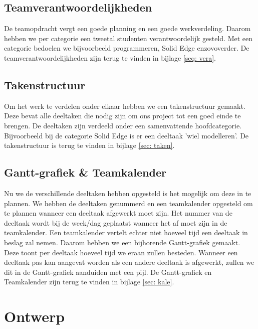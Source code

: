 \documentclass[a4paper,twoside,kulak]{kulakreport}
\begin{document}
	\subsection*{Teamverantwoordelijkheden}De teamopdracht vergt een goede planning en een goede werkverdeling. Daarom hebben we per categorie een tweetal studenten verantwoordelijk gesteld. Met een categorie bedoelen we bijvoorbeeld programmeren, Solid Edge enzovoverder. De teamverantwoordelijkheden zijn terug te vinden in bijlage \ref{seq: vera}.
	 
	\subsection*{Takenstructuur}Om het werk te verdelen onder elkaar hebben we een takenstructuur gemaakt. Deze bevat alle deeltaken die nodig zijn om ons project tot een goed einde te brengen. De deeltaken zijn verdeeld onder een samenvattende hoofdcategorie. Bijvoorbeeld bij de categorie Solid Edge is er een deeltaak 'wiel modelleren'. De takenstructuur is terug te vinden in bijlage \ref{sec: taken}.
	\subsection*{Gantt-grafiek \& Teamkalender} Nu we de verschillende deeltaken hebben opgesteld is het mogelijk om deze in te plannen. We hebben de deeltaken genummerd en een teamkalender opgesteld om te plannen wanneer een deeltaak afgewerkt moet zijn. Het nummer van de deeltaak wordt bij de week/dag geplaatst wanneer het af moet zijn in de teamkalender. Een teamkalender vertelt echter niet hoeveel tijd een deeltaak in beslag zal nemen. Daarom hebben we een bijhorende Gantt-grafiek gemaakt. Deze toont per deeltaak hoeveel tijd we eraan zullen besteden. Wanneer een deeltaak pas kan aangevat worden als een andere deeltaak is afgewerkt, zullen we dit in de Gantt-grafiek aanduiden met een pijl. De Gantt-grafiek en Teamkalender zijn terug te vinden in bijlage \ref{sec: kale}.
	
	\section{Ontwerp}
\end{document}
